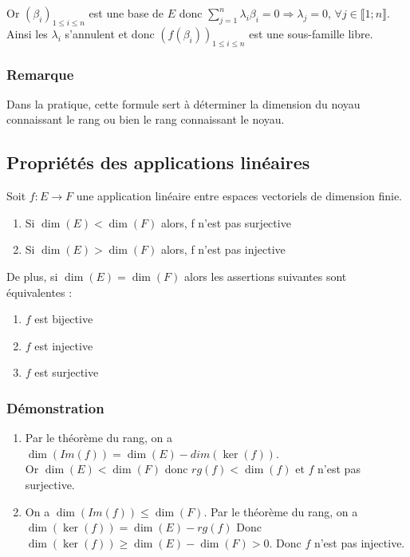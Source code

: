 \documentclass[a4paper,10pt]{book} %
\begin{document}
Or $(\beta_i)_{1 \leq i\leq n}$ est une base de $E$ donc $\displaystyle\sum\limits_{j=1}^n\lambda_i\beta_i=0\Rightarrow \lambda_j=0$, $\forall j\in \llbracket 1; n\rrbracket$.\\

Ainsi les $\lambda_i$ s'annulent et donc $(f(\beta_i))_{1\leq i\leq n}$ est une sous-famille libre.

\subsubsection{Remarque}
Dans la pratique, cette formule sert à déterminer la dimension du noyau connaissant le rang ou bien le rang connaissant le noyau.

\subsection{Propriétés des applications linéaires}\label{PropApplLin}
Soit $f:E\rightarrow F$ une application linéaire entre espaces vectoriels de dimension finie.\\
\begin{enumerate}
\item Si $\dim(E)<\dim(F)$ alors, f n'est pas surjective
\item Si $\dim(E)>\dim(F)$ alors, f n'est pas injective
\end{enumerate}\bigskip

De plus, si $\dim(E)=\dim(F)$ alors les assertions suivantes sont équivalentes :
\begin{enumerate}
\item $f$ est bijective
\item $f$ est injective
\item $f$ est surjective
\end{enumerate}

\subsubsection{Démonstration}
\begin{enumerate}
\item Par le théorème du rang, on a $\dim(Im(f))=\dim(E)-dim(\ker(f))$.\\
Or $\dim(E)<\dim(F)$ donc $rg(f)<\dim(f)$ et $f$ n'est pas surjective.

\item On a $\dim(Im(f))\leq \dim(F)$.
Par le théorème du rang, on a $\dim(\ker(f))=\dim(E)-rg(f)$
Donc $\dim(\ker(f))\geq \dim(E)-\dim(F)>0$. Donc $f$ n'est pas injective.
\end{enumerate}
\end{document}
